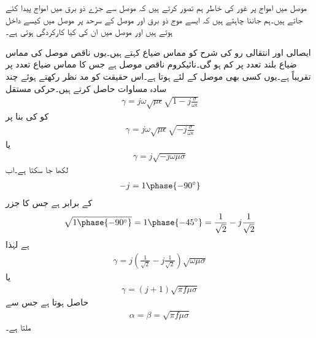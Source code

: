 
موصل میں امواج پر غور کی خاطر ہم تصور کرتے ہیں کہ موصل سے جڑے ذو برق میں امواج پیدا کئے جاتے ہیں۔ہم جاننا چاہتے ہیں کہ ایسے موج ذو برق اور موصل کے سرحد پر موصل میں کیسے داخل ہوتے ہیں اور موصل میں ان کی کیا کارکردگی ہوتی ہے۔

ایصالی اور انتقالی رو کی شرح  کو مماس ضیاع کہتے ہیں۔یوں ناقص موصل کی مماس ضیاع بلند تعدد پر کم ہو گی۔نائیکروم ناقص موصل ہے جس کا مماس ضیاع  تعدد پر  تقریباً  ہے۔یوں کسی بھی موصل کے لئے  ہوتا ہے۔اس حقیقت کو مد نظر رکھتے ہوئے چند سادہ مساوات حاصل کرتے ہیں۔حرکی مستقل
\begin{align*}
\gamma=j \omega \sqrt{\mu \epsilon} \sqrt{1-j \frac{\sigma}{\omega \epsilon}}
\end{align*}
کو  کی بنا پر
\begin{align*}
\gamma=j \omega \sqrt{\mu \epsilon}\sqrt{-j \frac{\sigma}{\omega \epsilon}}
\end{align*}
یا
\begin{align*}
\gamma=j \sqrt{-j \omega \mu \sigma}
\end{align*}
لکھا جا سکتا ہے۔اب
\begin{align*}
-j = 1\phase{-90^\circ}
\end{align*}
کے برابر ہے جس کا جزر
\begin{align*}
\sqrt{1\phase{-90^\circ}}=1\phase{-45^\circ}=\frac{1}{\sqrt{2}}-j \frac{1}{\sqrt{2}}
\end{align*}
ہے لہٰذا
\begin{align*}
\gamma=j \left(\frac{1}{\sqrt{2}}-j \frac{1}{\sqrt{2}}\right)\sqrt{\omega \mu \sigma}
\end{align*}
یا
\begin{align}
\gamma=\left(j+1 \right)\sqrt{\pi f \mu \sigma}
\end{align}
حاصل ہوتا ہے جس سے
\begin{align}
\alpha=\beta=\sqrt{\pi f \mu \sigma}
\end{align}
ملتا ہے۔


